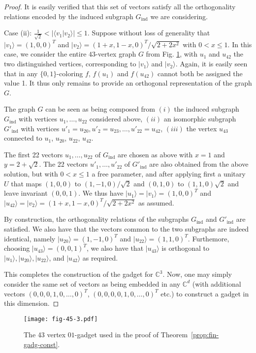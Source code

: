 \documentclass[twocolumn, a4paper, superscriptaddress,nofootinbib, accepted=2020-08-07, hyperref]{quantumarticle}
\begin{document}
\begin{proof}
It is easily verified that this set of vectors satisfy all the orthogonality relations encoded by the induced subgraph $G_{\text{ind}}$ we are considering.
	
Case (ii):  $\frac{1}{\sqrt{2}} < | \langle v_1 | v_2 \rangle| \leq 1$.
	Suppose without loss of generality that $|v_1 \rangle = (1,0,0)^T$ and $|v_{2} \rangle = (1+x,1-x,0)^T/\sqrt{2+2x^2}$ with $0 < x \leq 1$. In this case, we consider the entire $43$-vertex graph $G$ from Fig. \ref{fig:gadg-id-vec}, with  $u_1$ and $u_{42}$ the two distinguished vertices, corresponding to $|v_1 \rangle$ and $|v_2 \rangle$. Again, it is easily seen that in any $\{0,1\}$-coloring $f$,  $f(u_1)$ and $f(u_{42})$ cannot both be assigned the value 1. It thus only remains to provide an orthogonal representation of the graph $G$. 
	
The graph $G$ can be seen as being composed from $(i)$ the induced subgraph $G_{\text{ind}}$ with vertices $u_1,\ldots,u_{22}$ considered above, $(ii)$ an isomorphic subgraph $G'_{\text{ind}}$ with vertices $u'_1=u_{20},u'_2=u_{23},\ldots,u'_{22}=u_{42}$, $(iii)$ the vertex $u_{43}$ connected to $u_1$, $u_{20}$, $u_{22}$, $u_{42}$. 

The first 22 vectors $u_1,\ldots,u_{22}$ of $G_{\text{ind}}$ are chosen as above with $x = 1$ and $y = 2 + \sqrt{2}$. 
The 22 vectors $u'_1,\ldots,u'_{22}$ of $G'_{\text{ind}}$ are also obtained from the above solution, but with $0<x\leq 1$ a free parameter, and after applying first a unitary $U$ that maps  $(1,0,0)$ to $(1,-1,0)/\sqrt{2}$ and $(0,1,0)$ to $(1,1,0)\sqrt{2}$ and leave invariant $(0,0,1)$. We thus have $|u_1\rangle=|v_1\rangle=(1,0,0)^T$ and  $|u_{42}\rangle=|v_2\rangle=(1+x,1-x,0)^T/\sqrt{2+2x^2}$ as assumed.

By construction, the orthogonality relations of the subgraphs $G_{\text{ind}}$ and $G'_{\text{ind}}$ are satisfied. We also have that the vectors common to the two subgraphs are indeed identical, namely $|u_{20}\rangle=(1,-1,0)^T$ and $|u_{22}\rangle=(1,1,0)^T$. Furthemore, choosing $|u_{43}\rangle=(0,0,1)^T$, we also have that $|u_{43}\rangle$ is orthogonal to $|u_1\rangle, |u_{20}\rangle, |u_{22}\rangle$, and $|u_{42}\rangle$ as required. 

This completes the construction of the gadget for $\mathbb{C}^3$. Now, one may simply consider the same set of vectors as being embedded in any $\mathbb{C}^d$ (with additional vectors $(0,0,0,1,0,\dots,0)^T$, $(0,0,0,0,1,0,\dots,0)^T$ etc.) to construct a gadget in this dimension.
	\end{proof}
\begin{figure}[t]
	\centerline{\texttt{[image: fig-45-3.pdf]}}
	\caption{The 43 vertex $01$-gadget used in the proof of Theorem~\ref{prop:fin-gadg-const}.}
	\label{fig:gadg-id-vec}
\end{figure}
\end{document}
